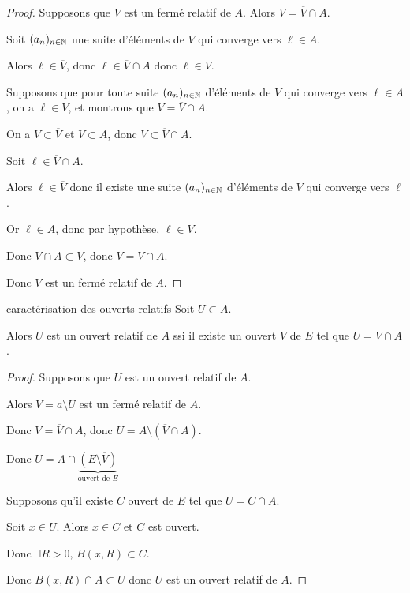 \begin{proof}
    Supposons que $V$ est un fermé relatif de $A$. 
    Alors $V = \overline V \cap A$. 

    Soit $(a_n)_{n \in \mathbb{N}}$ une suite d'éléments de $V$ qui converge vers $\ell \in A$.

    Alors $\ell \in \overline V$, donc $\ell \in \overline V \cap A$ donc $\ell \in V$.


    \svspace Supposons que pour toute suite $(a_n)_{n \in \mathbb{N}}$ d'éléments de $V$ qui converge vers
    $\ell \in A$, on a $\ell \in V$, et montrons que $V = \overline V \cap A$. 

    On a $V \subset \overline V$ et $V \subset A$, donc $V \subset \overline V \cap A$.

    Soit $\ell \in \overline V \cap A$.

    Alors $\ell \in \overline V$ donc il existe une suite $(a_n)_{n \in \mathbb{N}}$ d'éléments de $V$ qui converge vers $\ell$.

    Or $\ell \in A$, donc par hypothèse, $\ell \in V$.

    Donc $\overline V \cap A \subset V$, donc $V = \overline V \cap A$.

    Donc $V$ est un fermé relatif de $A$.
\end{proof}


\begin{proposition}{caractérisation des ouverts relatifs}{}
    Soit $U \subset A$. 

    Alors $U$ est un ouvert relatif de $A$ ssi il existe un ouvert $V$ de $E$ tel que 
    $U = V \cap A$.
    
\end{proposition}

\begin{proof}
    Supposons que $U$ est un ouvert relatif de $A$.

    Alors $V = a \setminus U$ est un fermé relatif de $A$.

    Donc $V = \overline V \cap A$, donc $U = A \setminus (\overline V \cap A)$. 

    Donc $U = A \cap \underbrace{(E \setminus \overline V)}_{\text{ouvert de } E}$

    \avspace Supposons qu'il existe $C$ ouvert de $E$ tel que $U = C \cap A$.

    Soit $x \in U$. Alors $x \in C$ et $C$ est ouvert.

    Donc $\exists R > 0, \, B(x, R) \subset C$.

    Donc $B(x, R) \cap A \subset U$ donc $U$ est un ouvert relatif de $A$.
\end{proof}



